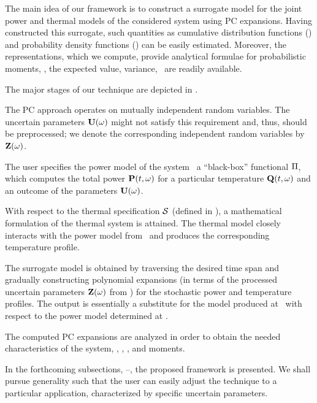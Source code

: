 The main idea of our framework is to construct a surrogate model for the joint power and thermal models of the considered system using PC expansions.
Having constructed this surrogate, such quantities as cumulative distribution functions (\cdfs) and probability density functions (\pdfs) can be easily estimated.
Moreover, the representations, which we compute, provide analytical formulae for probabilistic moments, \ie, the expected value, variance, \etc\ are readily available.

The major stages of our technique are depicted in .

The PC approach operates on mutually independent random variables. The uncertain parameters $\mathbf{U}(\omega)$ might not satisfy this requirement and, thus, should be preprocessed; we denote the corresponding independent random variables by $\mathbf{Z}(\omega)$.

The user specifies the power model of the system \via\ a ``black-box'' functional $\oPower$, which computes the total power $\mathbf{P}(t, \omega)$ for a particular temperature $\mathbf{Q}(t, \omega)$ and an outcome of the parameters $\mathbf{U}(\omega)$.

With respect to the thermal specification $\mathcal{S}$ (defined in ), a mathematical formulation of the thermal system is attained.
The thermal model closely interacts with the power model from \ and produces the corresponding temperature profile.

The surrogate model is obtained by traversing the desired time span and gradually constructing polynomial expansions (in terms of the processed uncertain parameters $\mathbf{Z}(\omega)$ from ) for the stochastic power and temperature profiles.
The output is essentially a substitute for the model produced at \ with respect to the power model determined at .

The computed PC expansions are analyzed in order to obtain the needed characteristics of the system, \eg, \cdfs, \pdfs, and moments.

In the forthcoming subsections, --, the proposed framework is presented.
We shall pursue generality such that the user can easily adjust the technique to a particular application, characterized by specific uncertain parameters.

